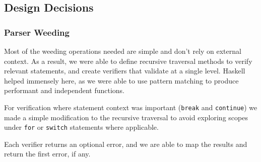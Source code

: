 \documentclass[11pt]{article}
\begin{document}
\subsection{Design Decisions}
\subsubsection{Parser Weeding}
Most of the weeding operations needed are simple and don't rely on
external context. As a result, we were able to define recursive
traversal methods to verify relevant statements, and create verifiers
that validate at a single level. Haskell helped immensely here, as we
were able to use pattern matching to produce performant and
independent functions.

For verification where statement context was important (\texttt{break}
and \texttt{continue}) we made a simple modification to the recursive
traversal to avoid exploring scopes under \texttt{for} or
\texttt{switch} statements where applicable.

Each verifier returns an optional error, and we are able to map the
results and return the first error, if any.
\end{document}
